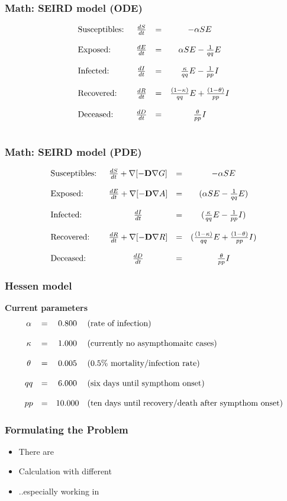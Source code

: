 \documentclass{beamer}
\begin{document}
\begin{frame}
	\frametitle{Math: SEIRD model (ODE)}
	\[
	\begin{array}{ l c c c }
		\text{Susceptibles: }& \frac{dS}{dt} & = & -\alpha SE  \\ \\
		\text{Exposed: }& \frac{dE}{dt} & = & \alpha SE-\frac{1}{qq}E\\ \\
		\text{Infected: }& \frac{dI}{dt} & = & \frac{\kappa}{qq} E-\frac{1}{pp}I\\ \\
		\text{Recovered: }& \frac{dR}{dt} & = & \frac{(1-\kappa)}{qq} E+\frac{(1-\theta)}{pp}I\\ \\
		\text{Deceased: }& \frac{dD}{dt} & = & \frac{\theta}{pp} I \\ \\
	\end{array}	
	\]
\end{frame}

\begin{frame}
	\frametitle{Math: SEIRD model (PDE)} 
	\[
	\begin{array}{ l c c c }
		\text{Susceptibles: }& \frac{d S}{dt} + \nabla[- \text{\textbf{D}} \nabla G] & = & - \alpha SE \\ \\
		\text{Exposed: }& \frac{d E}{dt} + \nabla[- \text{\textbf{D}} \nabla A] & = & (\alpha SE-\frac{1}{qq}E)\\ \\
		\text{Infected: }& \frac{d I}{dt} & = & (\frac{\kappa}{qq} E-\frac{1}{pp}I)\\ \\
		\text{Recovered: }& \frac{d R}{dt} + \nabla[- \text{\textbf{D}} \nabla R]
			& = & (\frac{(1-\kappa)}{qq} E+\frac{(1-\theta)}{pp}I)\\ \\
		\text{Deceased: }& \frac{d D}{dt} & = & \frac{\theta}{pp} I
	\end{array}	
	\]
\end{frame}

\begin{frame}
	\frametitle{Hessen model} 
	\textbf{Current parameters}
	\[
	\begin{array}{ c c c l }
		\alpha & = & 0.800 & \text{(rate of infection)}\\ \\
		\kappa & = & 1.000 & \text{(currently no asympthomaitc cases)}\\ \\
		\theta & = & 0.005 & \text{(0.5\% mortality/infection rate)}\\ \\
		qq & = & 6.000 & \text{(six days until sympthom onset)}\\ \\
		pp & = & 10.000 & \text{(ten days until recovery/death after sympthom onset)}
	\end{array}	
	\]
\end{frame}

\begin{frame}
	\frametitle{Formulating the Problem} 
	\begin{itemize}
		\item There are
		\item Calculation with different
		\item ..especially working in
	\end{itemize}
\end{frame}
\end{document}
